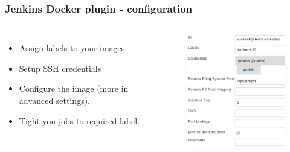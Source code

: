\documentclass[10pt,utf8]{beamer}
\begin{document}
\begin{frame}
	\frametitle{Jenkins Docker plugin - configuration}
	\begin{columns}
		\begin{itemize}
			\item Assign labels to your images.
			\vspace{1cm}
			\item Setup SSH credentials
			\vspace{1cm}
			\item Configure the image (more in advanced settings).
			\vspace{1cm}
			\item Tight you jobs to required label.
		\end{itemize}
		
		\begin{figure}
			\centering
			\hspace{-1cm}
			\includegraphics[width=6cm]{./img/docker_plugin_cfg2.eps}
		\end{figure}
	\end{columns}
\end{frame}
\end{document}

